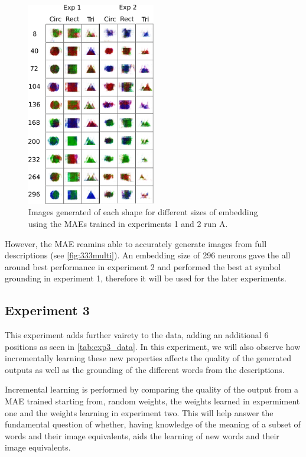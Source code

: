 \begin{figure}
\centering
\includegraphics[width=0.5\textwidth]{Figs/shapes/shapes331v333.png}
\caption{Images generated of each shape for different sizes of embedding using the MAEs trained in experiments 1 and 2 run A.}
\label{fig:shapes333v331}
\end{figure} %
However, the MAE reamins able to accurately generate images from full descriptions (see \autoref{fig:333multi}). 
An embedding size of 296 neurons gave the all around best performance in experiment 2 and performed the best at symbol grounding in experiment 1, therefore it will be used for the later experiments.

\subsection{Experiment 3}
This experiment adds further vairety to the data, adding an additional 6 positions as seen in \autoref{tab:exp3_data}. In this experiment, we will also observe how incrementally learning these new properties affects the quality of the generated outputs as well as the grounding of the different words from the descriptions. 

Incremental learning is performed by comparing the quality of the output from a MAE trained starting from, random weights, the weights learned in expermiment one and the weights learning in experiment two. This will help answer the fundamental question of whether, having knowledge of the meaning of a subset of words and their image equivalents, aids the learning of new words and their image equivalents.

